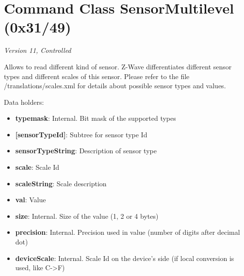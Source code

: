 \section{Command Class SensorMultilevel (0x31/49)}

\textit{Version 11, Controlled}
\newline

Allows to read different kind of sensor. Z-Wave differentiates different sensor types and different scales of this sensor. Please refer to the file /translations/scales.xml for details about possible sensor types and values.
\newline

\noindent
Data holders:

\begin{itemize}
\item \textbf{typemask}: Internal. Bit mask of the supported types
\item \textbf{[sensorTypeId]}: Subtree for sensor type Id
\item \qquad\textbf{sensorTypeString}: Description of sensor type
\item \qquad\textbf{scale}: Scale Id
\item \qquad\textbf{scaleString}: Scale description
\item \qquad\textbf{val}: Value
\item \qquad\textbf{size}: Internal. Size of the value (1, 2 or 4 bytes)
\item \qquad\textbf{precision}: Internal. Precision used in value (number of digits after decimal dot)
\item \qquad\textbf{deviceScale}: Internal. Scale Id on the device's side (if local conversion is used, like C->F)
\end{itemize}


